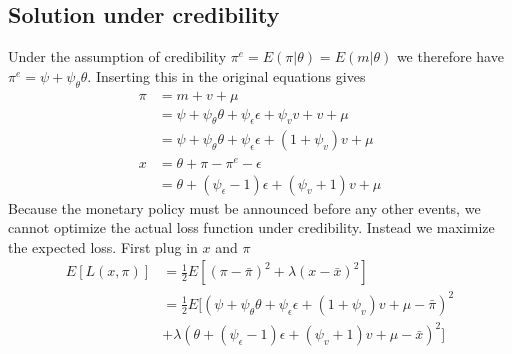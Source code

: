 \documentclass[12pt, a4paper]{article}
\begin{document}
\begin{spacing}{1.213}
\subsection{Solution under credibility}
Under the assumption of credibility $\pi^e = E(\pi| \theta) = E(m|\theta)$ we therefore have $\pi^e = \psi + \psi_{\theta} \theta$. Inserting this in the original equations gives
\begin{align*}
\pi &= m + v + \mu \\
& = \psi + \psi_{\theta} \theta + \psi_{\epsilon} \epsilon + \psi_v v + v + \mu \\
&= \psi + \psi_{\theta} \theta + \psi_{\epsilon} \epsilon +  (1 + \psi_v)v + \mu \\
x & = \theta + \pi - \pi^e - \epsilon \\
&= \theta + (\psi_{\epsilon} -1) \epsilon + (\psi_v +1 )v + \mu
\end{align*}
Because the monetary policy must be announced before any other events, we cannot optimize the actual loss function under credibility. Instead we maximize the expected loss. First plug in $x$ and $\pi$
\begin{align*}
E[L(x, \pi)] &= \frac{1}{2}E[(\pi - \bar{\pi})^2 + \lambda (x - \bar{x})^2 ] \\
& = \frac{1}{2}E[(\psi + \psi_{\theta} \theta + \psi_{\epsilon} \epsilon + (1 + \psi_v)v + \mu - \bar{\pi})^2  \\
&  +\lambda (\theta + (\psi_{\epsilon} -1) \epsilon + (\psi_v +1 )v + \mu - \bar{x})^2 ]
\end{align*}


\end{spacing}
\end{document}
